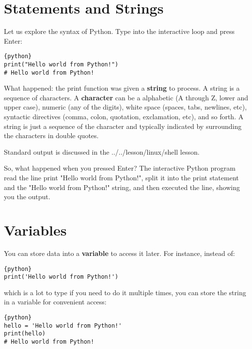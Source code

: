 \FILENAME



\section{Statements and Strings}\label{statements-and-strings}


Let us explore the syntax of Python. Type into the interactive loop and
press Enter:

\begin{lstlisting}{python}
print("Hello world from Python!")
# Hello world from Python! 
\end{lstlisting}

What happened: the print function was given a \textbf{string} to
process. A string is a sequence of characters. A \textbf{character} can
be a alphabetic (A through Z, lower and upper case), numeric (any of the
digits), white space (spaces, tabs, newlines, etc), syntactic directives
(comma, colon, quotation, exclamation, etc), and so forth. A string is
just a sequence of the character and typically indicated by surrounding
the characters in double quotes.

Standard output is discussed in the ../../lesson/linux/shell lesson.

So, what happened when you pressed Enter? The interactive Python program
read the line print "Hello world from Python!", split it into the print
statement and the "Hello world from Python!" string, and then executed
the line, showing you the output.

\section{Variables}\label{variables}

You can store data into a \textbf{variable} to access it later. For
instance, instead of:

\begin{lstlisting}{python}
print('Hello world from Python!')
\end{lstlisting}

which is a lot to type if you need to do it multiple times, you can
store the string in a variable for convenient access:

\begin{lstlisting}{python}
hello = 'Hello world from Python!'
print(hello)
# Hello world from Python!
\end{lstlisting}

